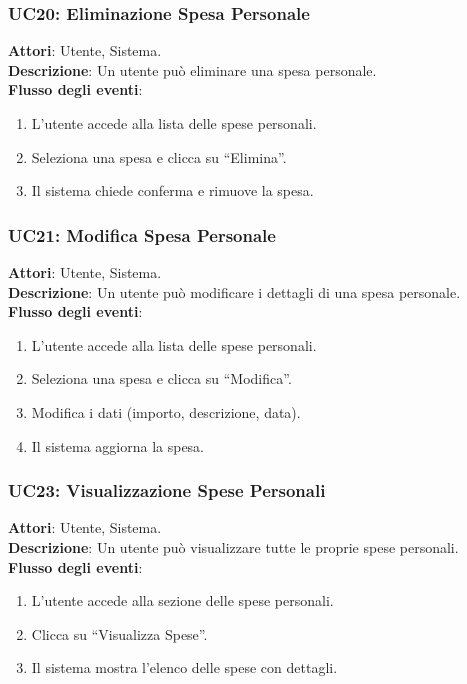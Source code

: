 \subsubsection{UC20: Eliminazione Spesa Personale}
\textbf{Attori}: Utente, Sistema. \\
\textbf{Descrizione}: Un utente può eliminare una spesa personale. \\
\textbf{Flusso degli eventi}:
\begin{enumerate}
    \item L’utente accede alla lista delle spese personali.
    \item Seleziona una spesa e clicca su ``Elimina''.
    \item Il sistema chiede conferma e rimuove la spesa.
\end{enumerate}

\subsubsection{UC21: Modifica Spesa Personale}
\textbf{Attori}: Utente, Sistema. \\
\textbf{Descrizione}: Un utente può modificare i dettagli di una spesa personale. \\
\textbf{Flusso degli eventi}:
\begin{enumerate}
    \item L’utente accede alla lista delle spese personali.
    \item Seleziona una spesa e clicca su ``Modifica''.
    \item Modifica i dati (importo, descrizione, data).
    \item Il sistema aggiorna la spesa.
\end{enumerate}

\subsubsection{UC23: Visualizzazione Spese Personali}
\textbf{Attori}: Utente, Sistema. \\
\textbf{Descrizione}: Un utente può visualizzare tutte le proprie spese personali. \\
\textbf{Flusso degli eventi}:
\begin{enumerate}
    \item L’utente accede alla sezione delle spese personali.
    \item Clicca su ``Visualizza Spese''.
    \item Il sistema mostra l’elenco delle spese con dettagli.
\end{enumerate}


